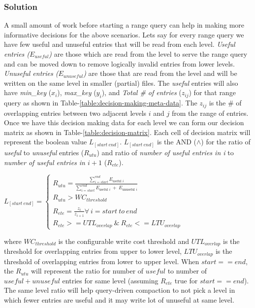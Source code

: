 \subsubsection{Solution}
A small amount of work before starting a range query can help in making more informative decisions for the above 
scenarios. Lets say for every range query we have few useful and unuseful entries that will be read from each level. 
\textit{Useful entries ($E_{useful}$)} are those which are read from the level to serve the range query and can be moved down to 
remove logically invalid entries from lower levels. \textit{Unuseful entries ($E_{unuseful}$)} are those that are read 
from the level and will be written on the same level in smaller (partial) files. The \textit{useful} entries will also 
have \textit{min\_key} (\textit{$x_i$}), \textit{max\_key} (\textit{$y_i$}), and \textit{Total \# of entries} (\textit{$z_{ij}$}) for that range query
as shown in Table-\ref{table:decision-making-meta-data}. The \textit{$z_{ij}$} is the \# of overlapping entries between 
two adjacent levels $i$ and $j$ from the range of entries. Once we have this decision making data for each level we can 
form our decision matrix as shown in Table-\ref{table:decision-matrix}. Each cell of decision matrix will represent the 
boolean value $L_{[start\ end]}$. $L_{[start\ end]}$ is the AND ($\land$) for the ratio of \textit{useful} to \textit{unuseful} 
entries ($R_{utu}$) and ratio of \textit{number of useful entries in i} to \textit{number of useful entries in $i+1$} ($R_{ete}$).
\hfill
\begin{center}
\begin{math}
    L_{[start\ end]}=\left\{
      \begin{array}{ll}
        R_{utu} = \frac{\sum_{i=start}^{end} E_{\text{useful }i}}{\sum_{i=start}^{end} {E_{\text{useful }i}\ +\ E_{\text{unuseful }i}}}\\
        R_{utu} > WC_{threshold}\\\\
        R_{ete} = \frac{z_{i}}{z_{i+1}} \forall\ i=start\ to\ end\\
        R_{ete} >= UTL_{overlap}\ \&\ R_{ete} <= LTU_{overlap}
      \end{array}
    \right.
  \end{math}
\end{center}
\hfill \break
where \textit{$WC_{threshold}$} is the configurable write cost threshold and \textit{$UTL_{overlap}$} is the threshold for 
overlapping entries from upper to lower level, \textit{$LTU_{overlap}$} is the threshold of overlapping entries from 
lower to upper level. When $start == end$, the \textit{$R_{utu}$} will represent the ratio for number of $useful$ to 
number of $useful + unuseful$ entries for same level (assuming \textit{$R_{ete}$} true for $start == end$). The same level ratio will help query-driven compaction to not pick 
a level in which fewer entries are useful and it may write lot of unuseful at same level.

